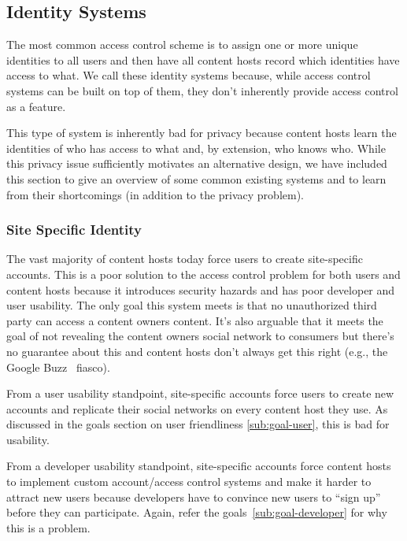 \documentclass[pdftex,12pt,a4papaer]{report}
\begin{document}
\subsection{Identity Systems}

The most common access control scheme is to assign one or more unique identities
to all users and then have all content hosts record which identities have access
to what. We call these identity systems because, while access control systems
can be built on top of them, they don't inherently provide access control as a
feature.

This type of system is inherently bad for privacy because content hosts learn
the identities of who has access to what and, by extension, who knows who. While
this privacy issue sufficiently motivates an alternative design, we have
included this section to give an overview of some common existing systems and to
learn from their shortcomings (in addition to the privacy problem).

\subsubsection{Site Specific Identity}

The vast majority of content hosts today force users to create site-specific
accounts. This is a poor solution to the access control problem for both users
and content hosts because it introduces security hazards and has poor developer
and user usability. The only goal this system meets is that no unauthorized
third party can access a content owners content. It's also arguable that it
meets the goal of not revealing the content owners social network to consumers
but there's no guarantee about this and content hosts don't always get this
right (e.g., the Google Buzz~\cite{google-buzz} fiasco).

From a user usability standpoint, site-specific accounts force users to create new
accounts and replicate their social networks on every content host they use. As
discussed in the goals section on user friendliness \ref{sub:goal-user}, this is
bad for usability.


From a developer usability standpoint, site-specific accounts force content
hosts to implement custom account/access control systems and make it harder to
attract new users because developers have to convince new users to ``sign up''
before they can participate. Again, refer the goals~\ref{sub:goal-developer} for
why this is a problem.
\end{document}
